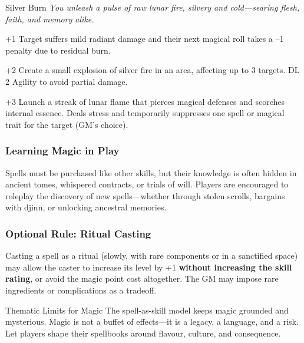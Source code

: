 \begin{WyrdSpell}[Elemental]{Silver Burn}\label{spell:silver-burn}
    \textit{You unleash a pulse of raw lunar fire, silvery and cold—searing flesh, faith, and memory alike.}
    
    \begin{WyrdSpellBlock}
        \item[+1] Target suffers mild radiant damage and their next magical roll takes a –1 penalty due to residual burn.
        
        \item[+2] Create a small explosion of silver fire in an area, affecting up to 3 targets. DL 2 Agility to avoid partial damage.
        
        \item[+3] Launch a streak of lunar flame that pierces magical defenses and scorches internal essence. Deals stress and temporarily suppresses one spell or magical trait for the target (GM’s choice).
    \end{WyrdSpellBlock}
\end{WyrdSpell}

\subsubsection*{Learning Magic in Play}

Spells must be purchased like other skills, but their knowledge is often hidden in ancient tomes, whispered contracts, or trials of will. Players are encouraged to roleplay the discovery of new spells—whether through stolen scrolls, bargains with djinn, or unlocking ancestral memories.

\subsubsection*{Optional Rule: Ritual Casting}

Casting a spell as a ritual (slowly, with rare components or in a sanctified space) may allow the caster to increase its level by +1 \textbf{without increasing the skill rating}, or avoid the magic point cost altogether. The GM may impose rare ingredients or complications as a tradeoff.

\begin{CommentBox}{Thematic Limits for Magic}
    The spell-as-skill model keeps magic grounded and mysterious. Magic is not a buffet of effects—it is a legacy, a language, and a risk. Let players shape their spellbooks around flavour, culture, and consequence.
\end{CommentBox}

